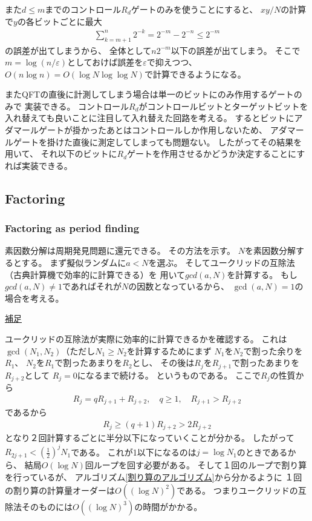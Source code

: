 \documentclass[a4paper, 10pt]{jsarticle}
\begin{document}
また$d \leq m$までのコントロール$R_d$ゲートのみを使うことにすると、
$xy/N$の計算で$y$の各ビットごとに最大
\begin{align}
	\sum_{k=m+1}^n 2^{-k} = 2^{-m} - 2^{-n} \leq 2^{-m}
\end{align}
の誤差が出てしまうから、
全体として$n 2^{-m}$以下の誤差が出てしまう。
そこで$m = \log (n / \varepsilon)$としておけば誤差を$\varepsilon$で抑えつつ、
$O (n \log n) = O(\log N \log\log N )$で計算できるようになる。

またQFTの直後に計測してしまう場合は単一のビットにのみ作用するゲートのみで
実装できる。
コントロール$R_d$がコントロールビットとターゲットビットを
入れ替えても良いことに注目して入れ替えた回路を考える。
するとビットにアダマールゲートが掛かったあとはコントロールしか作用しないため、
アダマールゲートを掛けた直後に測定してしまっても問題ない。
したがってその結果を用いて、
それ以下のビットに$R_d$ゲートを作用させるかどうか決定することにすれば実装できる。

\subsection{Factoring}
\subsubsection{Factoring as period finding}
素因数分解は周期発見問題に還元できる。
その方法を示す。
$N$を素因数分解するとする。
まず擬似ランダムに$a < N$を選ぶ。
そしてユークリッドの互除法（古典計算機で効率的に計算できる）を
用いて$gcd(a, N)$を計算する。
もし$gcd(a, N) \neq 1$であればそれが$N$の因数となっているから、
$\gcd(a, N) = 1$の場合を考える。

\begin{tcolorbox}[
enhanced,
colback = white,
boxrule = 0.5pt,
arc=2mm,
breakable
]
	\underline{補足}

	ユークリッドの互除法が実際に効率的に計算できるかを確認する。
	これは$\gcd(N_1, N_2)$（ただし$N_1 \geq N_2$を計算するためにまず
	$N_1$を$N_2$で割った余りを$R_1$、
	$N_2$を$R_1$で割ったあまりを$R_2$とし、
	その後は$R_j$を$R_{j+1}$で割ったあまりを$R_{j+2}$として
	$R_j = 0$になるまで続ける。
	というものである。
	ここで$R_j$の性質から
	\begin{align}
		R_j = q R_{j+1} + R_{j+2}, \quad
		q \geq 1, \quad R_{j+1} > R_{j+2}
	\end{align}
	であるから
	\begin{align}
		R_j \geq (q + 1) R_{j+2}
		> 2 R_{j+2}
	\end{align}
	となり２回計算するごとに半分以下になっていくことが分かる。
	したがって$R_{2j+1} < \left( \frac{1}{2} \right)^j N_1$である。
	これが1以下になるのは$j = \log N_1$のときであるから、
	結局$O(\log N)$回ループを回す必要がある。
	そして１回のループで割り算を行っているが、
	アルゴリズム\ref{割り算のアルゴリズム}から分かるように
	１回の割り算の計算量オーダーは$O((\log N)^2)$である。
	つまりユークリッドの互除法そのものには$O((\log N)^3)$の時間がかかる。
\end{tcolorbox}
\end{document}
